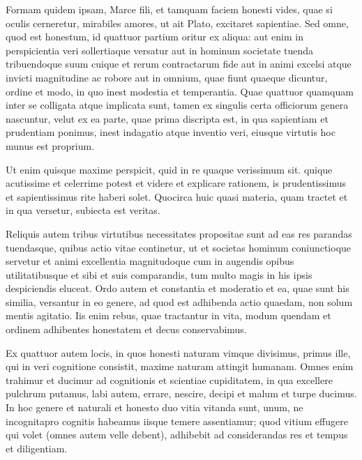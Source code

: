  Formam quidem ipsam, Marce fili, et tamquam faciem honesti vides, quae si oculis cerneretur, mirabiles amores, ut ait Plato, excitaret sapientiae. Sed omne, quod est honestum, id quattuor partium oritur ex aliqua: aut enim in perspicientia veri sollertiaque versatur aut in hominum societate tuenda tribuendoque suum cuique et rerum contractarum fide aut in animi excelsi atque invicti magnitudine ac robore aut in omnium, quae fiunt quaeque dicuntur, ordine et modo, in quo inest modestia et temperantia. Quae quattuor quamquam inter se colligata atque implicata sunt, tamen ex singulis certa officiorum genera nascuntur, velut ex ea parte, quae prima discripta est, in qua sapientiam et prudentiam ponimus, inest indagatio atque inventio veri, eiusque virtutis hoc munus est proprium.

 Ut enim quisque maxime perspicit, quid in re quaque verissimum sit. quique acutissime et celerrime potest et videre et explicare rationem, is prudentissimus et sapientissimus rite haberi solet. Quocirca huic quasi materia, quam tractet et in qua versetur, subiecta est veritas.

 Reliquis autem tribus virtutibus necessitates propositae sunt ad eas res parandas tuendasque, quibus actio vitae continetur, ut et societas hominum coniunctioque servetur et animi excellentia magnitudoque cum in augendis opibus utilitatibusque et sibi et suis comparandis, tum multo magis in his ipsis despiciendis eluceat. Ordo autem et constantia et moderatio et ea, quae sunt his similia, versantur in eo genere, ad quod est adhibenda actio quaedam, non solum mentis agitatio. Iis enim rebus, quae tractantur in vita, modum quendam et ordinem adhibentes honestatem et decus conservabimus.

 Ex quattuor autem locis, in quos honesti naturam vimque divisimus, primus ille, qui in veri cognitione consistit, maxime naturam attingit humanam. Omnes enim trahimur et ducimur ad cognitionis et scientiae cupiditatem, in qua excellere pulchrum putamus, labi autem, errare, nescire, decipi et malum et turpe ducimus. In hoc genere et naturali et honesto duo vitia vitanda sunt, unum, ne incognitapro cognitis habeamus iisque temere assentiamur; quod vitium effugere qui volet (omnes autem velle debent), adhibebit ad considerandas res et tempus et diligentiam.

